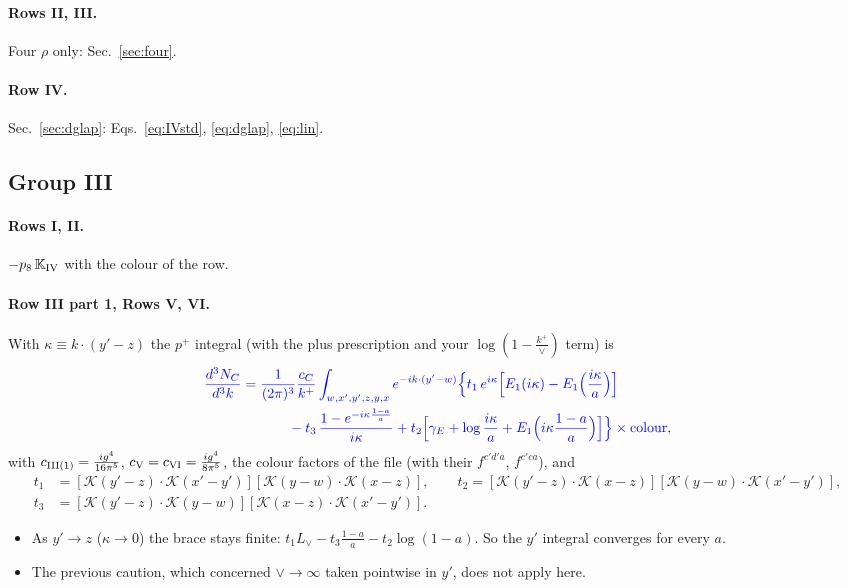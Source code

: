 \documentclass[10pt]{article}
\numberwithin{equation}{section}
\newcommand{\new}[1]{{\color{blue}#1}}
\newcommand{\Lv}{L_{\vee}}
\newcommand{\KK}{\mathcal K}
\newcommand{\pre}{\frac{1}{(2\pi)^3}}
\begin{document}
\paragraph{Rows II, III.} Four $\rho$ only: Sec.~\ref{sec:four}.
\paragraph{Row IV.} Sec.~\ref{sec:dglap}: Eqs.~\eqref{eq:IVstd}, \eqref{eq:dglap}, \eqref{eq:lin}.

\subsection{Group III}
\paragraph{Rows I, II.} \new{$-p_8\,\mathbb K_{\rm IV}$} with the colour of the row.
\paragraph{Row III part 1, Rows V, VI.} With $\kappa\equiv k\cdot(y'-z)$ the $p^+$ integral (with the plus prescription and your $\log(1-\frac{k^+}{\vee})$ term) is
\begin{equation}
\new{\begin{aligned}\frac{d^3N_C}{d^3k}={}&\pre\frac{c_C}{k^+}\int_{w,x',y',z,y,x}e^{-ik\cdot(y'-w)}\Big\{t_1\,e^{i\kappa}\Big[E_1(i\kappa)-E_1\Big(\frac{i\kappa}{a}\Big)\Big]\\&\qquad-t_3\,\frac{1-e^{-i\kappa\frac{1-a}{a}}}{i\kappa}+t_2\Big[\gamma_E+\log\frac{i\kappa}{a}+E_1\Big(i\kappa\frac{1-a}{a}\Big)\Big]\Big\}\times\text{colour},\end{aligned}}
\label{eq:Crow}
\end{equation}
with $c_{\rm III(1)}=\frac{ig^4}{16\pi^5}$, $c_{\rm V}=c_{\rm VI}=\frac{ig^4}{8\pi^5}$, the colour factors of the file (with their $f^{c'd'a}$, $f^{c'ca}$), and
\begin{align*}
t_1&=[\KK(y'-z)\cdot\KK(x'-y')][\KK(y-w)\cdot\KK(x-z)],\qquad t_2=[\KK(y'-z)\cdot\KK(x-z)][\KK(y-w)\cdot\KK(x'-y')],\\
t_3&=[\KK(y'-z)\cdot\KK(y-w)][\KK(x-z)\cdot\KK(x'-y')].
\end{align*}
\begin{itemize}
\item As $y'\to z$ ($\kappa\to0$) the brace stays finite: $t_1\Lv-t_3\frac{1-a}{a}-t_2\log(1-a)$. So the $y'$ integral converges for every $a$.
\item The previous caution, which concerned $\vee\to\infty$ taken pointwise in $y'$, does not apply here.
\end{itemize}
\end{document}
